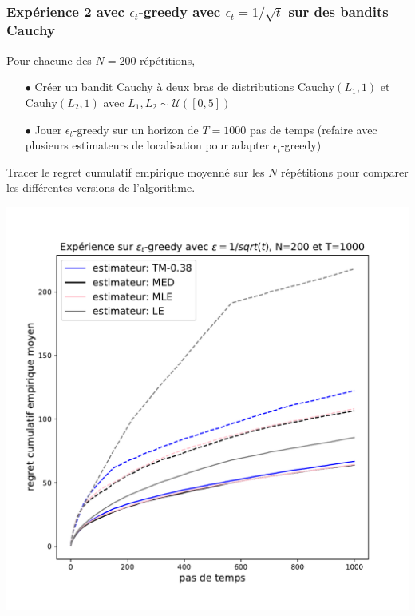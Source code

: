 \documentclass[8pt, sans]{beamer}
\begin{document}
\begin{frame}

\frametitle{Expérience 2 avec $\epsilon_t$-greedy avec $\epsilon_t=1/\sqrt{t}$ sur des bandits Cauchy}

Pour chacune des $N=200$ répétitions,\\

\pause

\begin{itemize}

\item[$\bullet$] Créer un bandit Cauchy à deux bras de distributions $\mathrm{Cauchy}(L_1,1)$ et $\mathrm{Cauhy}(L_2,1)$ avec $L_1,L_2\sim\mathcal{U}([0,5])$

\pause
\item[$\bullet$] Jouer $\epsilon_t$-greedy sur un horizon de $T=1000$ pas de temps (refaire avec plusieurs estimateurs de localisation pour adapter $\epsilon_t$-greedy)
\end{itemize}

\pause
Tracer le regret cumulatif empirique moyenné sur les $N$ répétitions pour comparer les différentes versions de l'algorithme.

\begin{center}
\includegraphics[scale=0.3]{experience-epsilon-t-greedy-2.pdf}
\end{center}

\end{frame}
\end{document}
